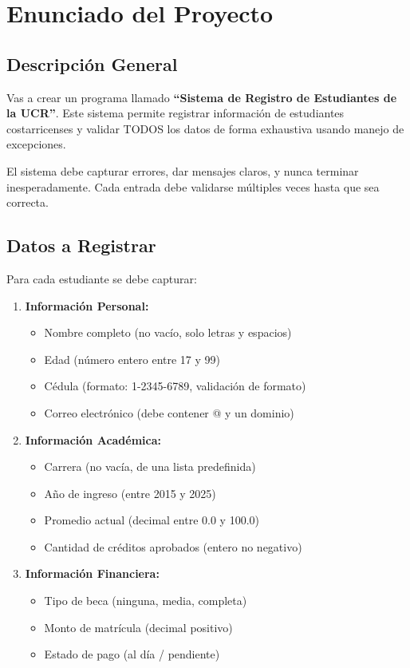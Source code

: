 \documentclass[12pt,a4paper]{article}
\begin{document}
\section{Enunciado del Proyecto}

\subsection{Descripción General}

Vas a crear un programa llamado \textbf{``Sistema de Registro de Estudiantes de la UCR''}. Este sistema permite registrar información de estudiantes costarricenses y validar TODOS los datos de forma exhaustiva usando manejo de excepciones.

El sistema debe capturar errores, dar mensajes claros, y nunca terminar inesperadamente. Cada entrada debe validarse múltiples veces hasta que sea correcta.

\subsection{Datos a Registrar}

Para cada estudiante se debe capturar:

\begin{enumerate}
    \item \textbf{Información Personal:}
    \begin{itemize}
        \item Nombre completo (no vacío, solo letras y espacios)
        \item Edad (número entero entre 17 y 99)
        \item Cédula (formato: 1-2345-6789, validación de formato)
        \item Correo electrónico (debe contener @ y un dominio)
    \end{itemize}
    
    \item \textbf{Información Académica:}
    \begin{itemize}
        \item Carrera (no vacía, de una lista predefinida)
        \item Año de ingreso (entre 2015 y 2025)
        \item Promedio actual (decimal entre 0.0 y 100.0)
        \item Cantidad de créditos aprobados (entero no negativo)
    \end{itemize}
    
    \item \textbf{Información Financiera:}
    \begin{itemize}
        \item Tipo de beca (ninguna, media, completa)
        \item Monto de matrícula (decimal positivo)
        \item Estado de pago (al día / pendiente)
    \end{itemize}
\end{enumerate}
\end{document}
